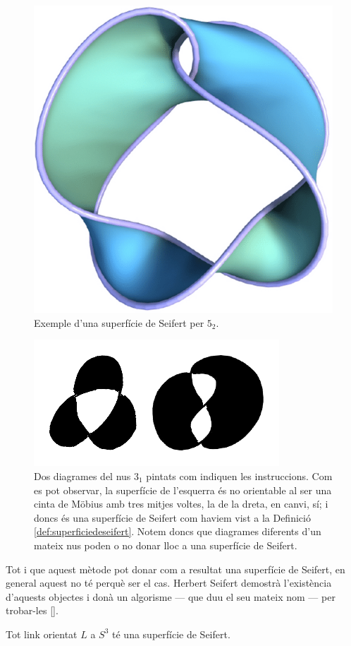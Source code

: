 \begin{figure}
	\centering
	\includegraphics[width=0.6\linewidth]{img/seifertsurface.png}
	\caption{Exemple d'una superfície de Seifert per $5_2$.}\label{fig:superficiedeseifert}
\end{figure}

\begin{figure}
	\centering
	\includegraphics[width=0.6\linewidth]{img/trefoilseifert.png}
	\caption{Dos diagrames del nus $3_1$ pintats com indiquen les instruccions. Com es pot observar, la superfície de l'esquerra és no orientable al ser una cinta de Möbius amb tres mitjes voltes, la de la dreta, en canvi, sí; i doncs és una superfície de Seifert com haviem vist a la Definició \ref{def:superficiedeseifert}. Notem doncs que diagrames diferents d'un mateix nus poden o no donar lloc a una superfície de Seifert.}\label{fig:trefoilseifert}
\end{figure}

Tot i que aquest mètode pot donar com a resultat una superfície de Seifert, en general aquest no té perquè ser el cas. Herbert Seifert demostrà l'existència d'aquests objectes i donà un algorisme --- que duu el seu mateix nom --- per trobar-les [\cite{seifert}].

\begin{theorem}\label{theo:existenciadesuperficiesdeseifert}
	Tot link orientat $L$ a $S^3$ té una superfície de Seifert.
\end{theorem}

